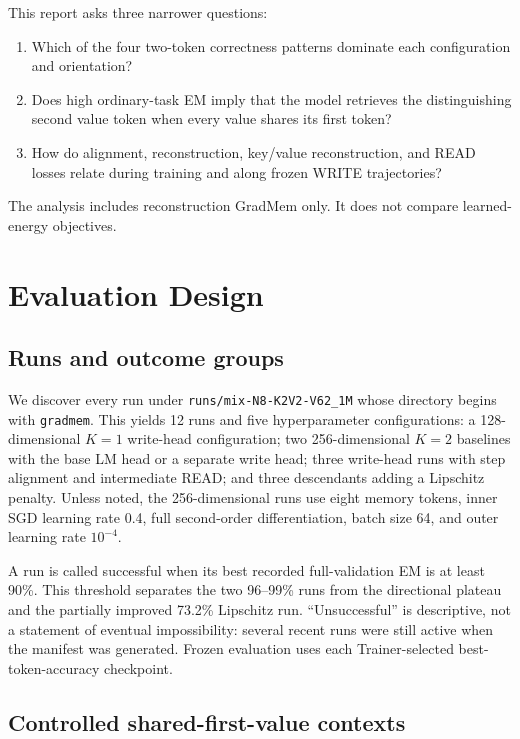 \documentclass{article}
\newcommand{\gm}{GradMem}
\begin{document}
This report asks three narrower questions:
\begin{enumerate}
  \item Which of the four two-token correctness patterns dominate each configuration and orientation?
  \item Does high ordinary-task EM imply that the model retrieves the distinguishing second value token when every value shares its first token?
  \item How do alignment, reconstruction, key/value reconstruction, and READ losses relate during training and along frozen WRITE trajectories?
\end{enumerate}

The analysis includes reconstruction \gm{} only.  It does not compare learned-energy objectives.

\section{Evaluation Design}

\subsection{Runs and outcome groups}

We discover every run under \texttt{runs/mix-N8-K2V2-V62\_1M} whose directory begins with \texttt{gradmem}.  This yields 12 runs and five hyperparameter configurations: a 128-dimensional $K=1$ write-head configuration; two 256-dimensional $K=2$ baselines with the base LM head or a separate write head; three write-head runs with step alignment and intermediate READ; and three descendants adding a Lipschitz penalty.  Unless noted, the 256-dimensional runs use eight memory tokens, inner SGD learning rate 0.4, full second-order differentiation, batch size 64, and outer learning rate $10^{-4}$.

A run is called successful when its best recorded full-validation EM is at least 90\%.  This threshold separates the two 96--99\% runs from the directional plateau and the partially improved 73.2\% Lipschitz run.  ``Unsuccessful'' is descriptive, not a statement of eventual impossibility: several recent runs were still active when the manifest was generated.  Frozen evaluation uses each Trainer-selected best-token-accuracy checkpoint.

\subsection{Controlled shared-first-value contexts}
\end{document}
